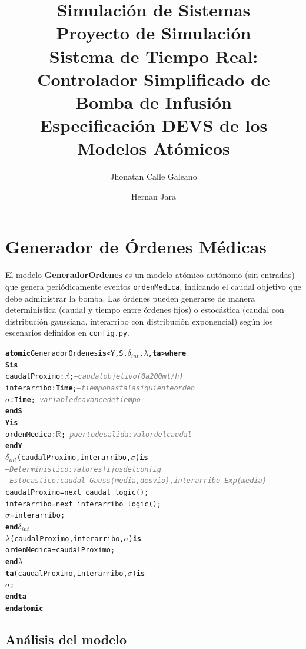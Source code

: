 \documentclass[12pt, a4paper]{article}
\title{
    \large Simulación de Sistemas \\[0.5em]
    \LARGE \textbf{Proyecto de Simulación} \\[0.3em]
    \large Sistema de Tiempo Real: Controlador Simplificado de Bomba de Infusión \\[1em]
    \normalsize Especificación DEVS de los Modelos Atómicos
}
\author{
    Jhonatan Calle Galeano \and Hernan Jara
}
\date{}
\newcommand{\kw}[1]{\textbf{#1}}
\newcommand{\cmlR}{$\mathbb{R}$}
\newcommand{\cmlTime}{\textbf{Time}}
\newcommand{\cmlsigma}{$\sigma$}
\newcommand{\dint}{$\delta_{\mathit{int}}$}
\newcommand{\clambda}{$\lambda$}
\newcommand{\cmlta}{\textbf{ta}}
\newcommand{\cmlcomment}[1]{\textit{\textcolor{gray}{#1}}}
\newenvironment{cmldevs}{%
  \begin{alltt}\small%
}{%
  \end{alltt}%
}
\begin{document}
\maketitle
\thispagestyle{empty}

\section{Generador de Órdenes Médicas}

El modelo \textbf{GeneradorOrdenes} es un modelo atómico autónomo (sin entradas)
que genera periódicamente eventos \texttt{ordenMedica}, indicando el caudal objetivo
que debe administrar la bomba. Las órdenes pueden generarse de manera determinística
(caudal y tiempo entre órdenes fijos) o estocástica (caudal con distribución gaussiana,
interarribo con distribución exponencial) según los escenarios definidos en
\texttt{config.py}.

\begin{center}
\begin{cmldevs}
\kw{atomic} GeneradorOrdenes \kw{is} <Y, S, \dint{}, \clambda{}, \cmlta{}> \kw{where}
\kw{S is}
    caudalProximo : \cmlR{};    \cmlcomment{-- caudal objetivo (0 a 200 ml/h)}
    interarribo   : \cmlTime{};  \cmlcomment{-- tiempo hasta la siguiente orden}
    \cmlsigma{}             : \cmlTime{};  \cmlcomment{-- variable de avance de tiempo}
\kw{end S}
\kw{Y is}
    ordenMedica : \cmlR{};      \cmlcomment{-- puerto de salida: valor del caudal}
\kw{end Y}
\dint{}(caudalProximo, interarribo, \cmlsigma{}) \kw{is}
    \cmlcomment{-- Deterministico: valores fijos del config}
    \cmlcomment{-- Estocastico: caudal ~ Gauss(media, desvio), interarribo ~ Exp(media)}
    caudalProximo = next\_caudal\_logic();
    interarribo   = next\_interarribo\_logic();
    \cmlsigma{}   = interarribo;
\kw{end} \dint{}
\clambda{}(caudalProximo, interarribo, \cmlsigma{}) \kw{is}
    ordenMedica = caudalProximo;
\kw{end} \clambda{}
\cmlta{}(caudalProximo, interarribo, \cmlsigma{}) \kw{is}
    \cmlsigma{};
\kw{end} \cmlta{}
\kw{end atomic}
\end{cmldevs}
\label{fig:generador-ordenes}
\end{center}

\subsection*{Análisis del modelo}
\end{document}
